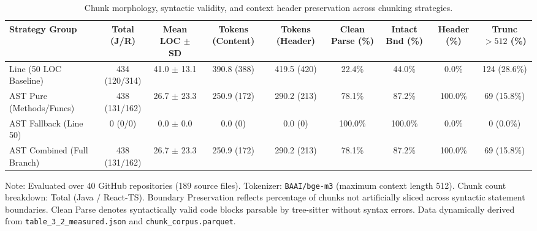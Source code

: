 \begin{table}[t]
\caption{Chunk morphology, syntactic validity, and context header preservation across chunking strategies.}
\label{tab:chunk_morphology}
\centering\scriptsize
\setlength{\tabcolsep}{2.5pt}
\begin{threeparttable}
\begin{tabular}{@{}lcccccccc@{}}
\toprule
Strategy Group & Total (J/R) & Mean LOC $\pm$ SD & Tokens (Content) & Tokens (Header) & Clean Parse (\%) & Intact Bnd (\%) & Header (\%) & Trunc $>512$ (\%) \\
\midrule
Line (50 LOC Baseline) & 434 (120/314) & 41.0 $\pm$ 13.1 & 390.8 (388) & 419.5 (420) & 22.4\% & 44.0\% & 0.0\% & 124 (28.6\%) \\
\cmidrule(lr){1-9}
AST Pure (Methods/Funcs) & 438 (131/162) & 26.7 $\pm$ 23.3 & 250.9 (172) & 290.2 (213) & 78.1\% & 87.2\% & 100.0\% & 69 (15.8\%) \\
AST Fallback (Line 50) & 0 (0/0) & 0.0 $\pm$ 0.0 & 0.0 (0) & 0.0 (0) & 100.0\% & 100.0\% & 0.0\% & 0 (0.0\%) \\
AST Combined (Full Branch) & 438 (131/162) & 26.7 $\pm$ 23.3 & 250.9 (172) & 290.2 (213) & 78.1\% & 87.2\% & 100.0\% & 69 (15.8\%) \\
\bottomrule
\end{tabular}
\begin{tablenotes}\footnotesize
\item[] Note: Evaluated over 40 GitHub repositories (189 source files). Tokenizer: \texttt{BAAI/bge-m3} (maximum context length 512). Chunk count breakdown: Total (Java / React-TS). Boundary Preservation reflects percentage of chunks not artificially sliced across syntactic statement boundaries. Clean Parse denotes syntactically valid code blocks parsable by tree-sitter without syntax errors. Data dynamically derived from \texttt{table\_3\_2\_measured.json} and \texttt{chunk\_corpus.parquet}.
\end{tablenotes}
\end{threeparttable}
\end{table}